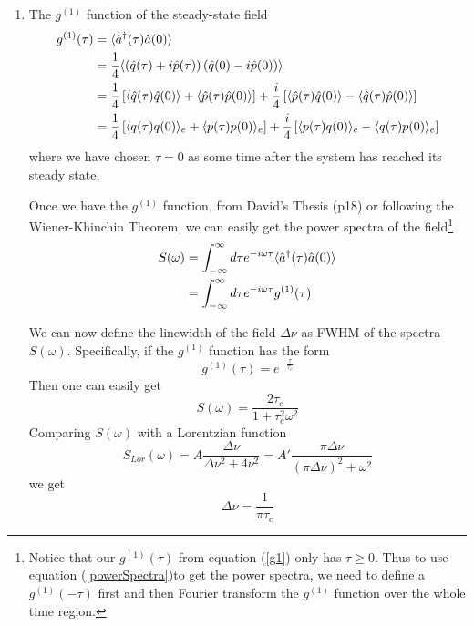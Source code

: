 \documentclass{article}
\begin{document}
\begin{enumerate}
    \item The $g^{(1)}$ function of the steady-state field
        \begin{align}
                \label{g1}
            \notag g^{(1)}(\tau) &= \langle \hat{a}^\dagger(\tau) \hat{a}(0) \rangle\\
            \notag   &= \frac{1}{4} \langle \left( \hat{q}(\tau)+i\hat{p}(\tau)\right)\left(\hat{q}(0)-i\hat{p}(0) \right)\rangle\\
            \notag   &= \frac{1}{4} \left[\langle\hat{q}(\tau)\hat{q}(0)\rangle+\langle\hat{p}(\tau)\hat{p}(0)\rangle\right]+\frac{i}{4}\left[\langle\hat{p}(\tau)\hat{q}(0)\rangle-\langle\hat{q}(\tau)\hat{p}(0)\rangle\right]\\
                     &= \frac{1}{4} \left[\langle q(\tau)q(0)\rangle_e+\langle p(\tau)p(0)\rangle_e\right]+\frac{i}{4}\left[\langle p(\tau)q(0)\rangle_e-\langle q(\tau)p(0)\rangle_e\right]
        \end{align}
        where we have chosen $\tau = 0$ as some time after the system has reached its steady state.
        
    Once we have the $g^{(1)}$ function, from David's Thesis (p18) or following the Wiener-Khinchin Theorem, we can easily get the power spectra of the field\footnote{Notice that our $g^{(1)}(\tau)$ from equation (\ref{g1}) only has $\tau \geq 0$. Thus to use equation (\ref{powerSpectra})to get the power spectra, we need to define a $g^{(1)}(-\tau)$ first and then Fourier transform the $g^{(1)}$ function over the whole time region.} 
    \begin{align}
     \label{powerSpectra}
        \notag    S(\omega) &= \int_{-\infty}^{\infty}d\tau e^{-i\omega \tau}\langle\hat{a}^\dagger(\tau)\hat{a}(0)\rangle\\
                  &= \int_{-\infty}^{\infty}d\tau e^{-i\omega \tau}g^{(1)}(\tau)
    \end{align}
    
   We can now define the linewidth of the field $\Delta \nu$ as FWHM of the spectra $S(\omega)$. Specifically, if the $g^{(1)}$ function has the form
   \begin{equation}
       g^{(1)}(\tau) = e^{-\frac{\tau}{\tau_c}}
   \end{equation}
   Then one can easily get 
   \begin{equation}
       S(\omega) = \frac{2\tau_c}{1+\tau_c^2 \omega^2}
   \end{equation}
   Comparing $S(\omega)$ with a Lorentzian function
  \begin{equation}
      S_{Lor}(\omega) = A \frac{\Delta \nu}{\Delta \nu^2+4\nu^2} = A'\frac{\pi \Delta \nu}{(\pi\Delta\nu)^2+\omega^2}
  \end{equation}
  we get
   \begin{equation}
       \Delta \nu = \frac{1}{\pi \tau_c}
   \end{equation}
    

\end{enumerate}
\end{document}
